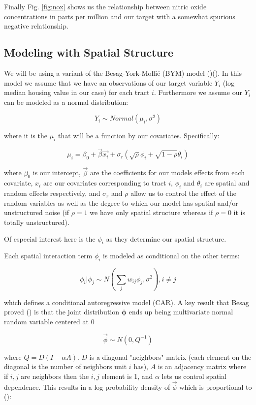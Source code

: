 \documentclass[11pt]{article}
\begin{document}
\FloatBarrier

Finally Fig. \ref{fig:nox} shows us the relationship between nitric oxide concentrations in parts per million and our target with a somewhat spurious negative relationship. 

\newpage

\subsection{Modeling with Spatial Structure} \label{model_intro}

We will be using a variant of the Besag-York-Mollié (BYM) model (\cite{book})(\cite{bymstan}). In this model we assume that we have an observations of our target variable $Y_i$ (log median housing value in our case) for each tract $i$. Furthermore we assume our $Y_i$ can be modeled as a normal distribution:

$$Y_i \sim Normal(\mu_i, \sigma^2)$$

where it is the $\mu_i$ that will be a function by our covariates. Specifically:

$$\mu_i= \beta_0 + \vec{\beta} \vec{x_i} + \sigma_r\left( \sqrt{\rho}\phi_i + \sqrt{1-\rho}\theta_i \right)$$

where $\beta_0$ is our intercept, $\vec{\beta}$ are the coefficients for our models effects from each covariate, $x_i$ are our covariates corresponding to tract $i$, $\phi_i$ and $\theta_i$ are spatial and random effects respectively, and $\sigma_r$ and $\rho$ allow us to control the effect of the random variables as well as the degree to which our model has spatial and/or unstructured noise (if $\rho=1$ we have only spatial structure whereas if $\rho=0$ it is totally unstructured). 

Of especial interest here is the $\phi_i$ as they determine our spatial structure. 
\newline

Each spatial interaction term $\phi_i$ is modeled as conditional on the other terms:

$$\phi_i | \phi_j \sim N\left(\sum_j w_{ij}\phi_j, \sigma^2  \right), i\neq j$$

which defines a conditional autoregressive model (CAR). A key result that Besag proved (\cite{besag}) is that the joint distribution $\bm{\phi}$ ends up being multivariate normal random variable centered at 0

$$\vec{\phi}\sim N(0, Q^{-1})$$

where $Q=D(I-\alpha A)$. $D$ is a diagonal "neighbors" matrix (each element on the diagonal is the number of neighbors unit $i$ has), $A$ is an adjacency matrix where if $i,j$ are neighbors then the $i,j$ element is 1, and $\alpha$ lets us control spatial dependence. This results in a log probability density of $\vec{\phi}$ which is proportional to (\cite{bymstan}):
\end{document}
